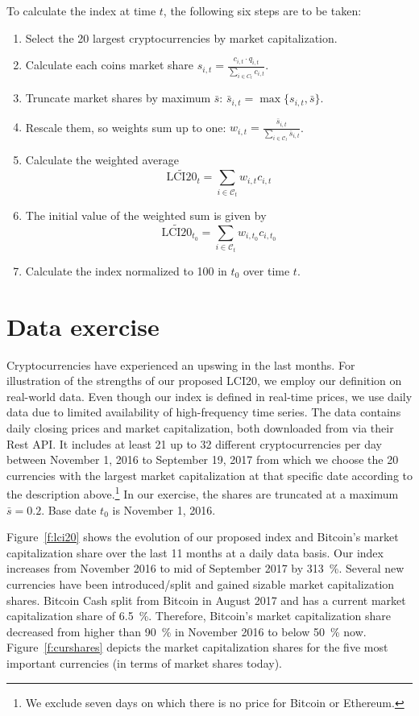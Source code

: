 \documentclass[11pt]{article}
\begin{document}
\noindent To calculate the index at time $t$, the following six steps are to be taken:
\begin{enumerate}
  \item Select the 20 largest cryptocurrencies by market capitalization.
  \item Calculate each coins market share $s_{i,t} = \frac{c_{i,t} \cdot q_{i,t}}{\sum_{i \in C_t} c_{i,t}}$.
  \item Truncate market shares by maximum $\bar s$: $\bar s_{i,t} = \max\{ s_{i,t}, \bar s\}$.
  \item Rescale them, so weights sum up to one: $w_{i,t} = \frac{\bar s_{i,t}}{\sum_{i \in \mathcal{C}_t} \bar s_{i,t}}$.
  \item Calculate the weighted average $$\widetilde{\text{LCI20}}_t = \sum_{i \in \mathcal{C}_{t}} w_{i,t} c_{i,t}$$
  \item The initial value of the weighted sum is given by $$\widetilde{\text{LCI20}}_{t_0} = \sum_{i \in \mathcal{C}_{t}} w_{i,t_0} c_{i,t_0}$$
  \item Calculate the index normalized to 100 in $t_0$ over time $t$. %
\end{enumerate}


\section{Data exercise}

Cryptocurrencies have experienced an upswing in the last months.
For illustration of the strengths of our proposed LCI20, we employ our definition on real-world data.
Even though our index is defined in real-time prices, we use daily data due to limited availability of high-frequency time series.
The data contains daily closing prices and market capitalization, both downloaded from \cite{CoinCap} via their Rest API.
It includes at least 21 up to 32 different cryptocurrencies per day between November 1, 2016 to September 19, 2017 from which we choose the 20 currencies with the largest market capitalization at that specific date according to the description above.\footnote{We exclude seven days on which there is no price for Bitcoin or Ethereum.}
In our exercise, the shares are truncated at a maximum $\bar s = 0.2$.
Base date $t_0$ is November 1, 2016.

Figure~\ref{f:lci20} shows the evolution of our proposed index and Bitcoin's market capitalization share over the last 11 months at a daily data basis.
Our index increases from November 2016 to mid of September 2017 by 313~\%.
Several new currencies have been introduced/split and gained sizable market capitalization shares.
Bitcoin Cash split from Bitcoin in August 2017 and has a current market capitalization share of 6.5~\%.
Therefore, Bitcoin's market capitalization share decreased from higher than 90~\% in November 2016 to below 50~\% now.
Figure~\ref{f:curshares} depicts the market capitalization shares for the five most important currencies (in terms of market shares today).
\end{document}
